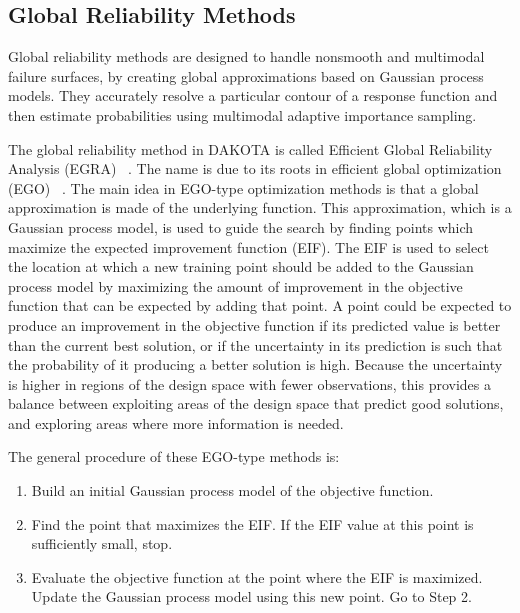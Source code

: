\subsection{Global Reliability Methods}\label{uq:reliability:global}

Global reliability methods are designed to handle nonsmooth and
multimodal failure surfaces, by creating global approximations based
on Gaussian process models. They accurately resolve a particular
contour of a response function and then estimate probabilities using
multimodal adaptive importance sampling.

The global reliability method in DAKOTA is called 
Efficient Global Reliability Analysis (EGRA) ~\cite{Bic07}.  
The name is due to its 
roots in efficient global optimization (EGO) ~\cite{Jon98,Hua06}.
The main idea in EGO-type optimization methods is that a global 
approximation is made of the underlying function.  This approximation, 
which is a Gaussian process model, is used to guide the search by finding 
points which maximize the expected improvement function (EIF). 
The EIF is used to select the location at which a new training point should be
added to the Gaussian process model by maximizing the amount of improvement 
in the objective function that can be expected by adding that point.
A point could be expected to produce an improvement in the objective function 
if its predicted value is better than the current best solution, or if the 
uncertainty in its prediction is such that the probability of it producing
a better solution is high.
Because the uncertainty is higher in regions of the design space with fewer
observations, this provides a balance between exploiting areas of the
design space that predict good solutions, and exploring areas where more
information is needed.

The general procedure of these EGO-type methods is:
\begin{enumerate}
\item Build an initial Gaussian process model of the objective function.
\item Find the point that maximizes the EIF.
      If the EIF value at this point is sufficiently small, stop.
\item Evaluate the objective function at the point where the EIF is maximized.
      Update the Gaussian process model using this new point.
      Go to Step 2.
\end{enumerate}

